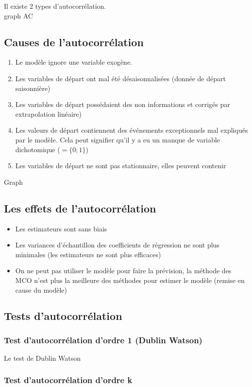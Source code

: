 \documentclass{article}
\begin{document}
Il existe 2 types d'autocorrélation. \\
graph AC

\subsection{Causes de l'autocorrélation}
\begin{enumerate}
	\item Le modèle ignore une variable exogène.
	\item Les variables de départ ont mal été désaisonnalisées (donnée de départ saisonnière)
	\item Les variables de départ possédaient des non informations et corrigés par extrapolation linéaire)
	\item Les valeurs de départ contiennent des événements exceptionnels mal expliqués par le modèle. Cela peut signifier qu'il y a eu un manque de variable dichotomique ($= \{0;1\}$)
	\item Les variables de départ ne sont pas stationnaire, elles peuvent contenir 
\end{enumerate}
Graph

\subsection{Les effets de l'autocorrélation}
\begin{itemize}
	\item Les estimateurs sont sans biais
	\item Les variances d'échantillon des coefficients de régression ne sont plus minimales (les estimateurs ne sont plus efficaces)
	\item On ne peut pas utiliser le modèle pour faire la prévision, la méthode des MCO n'est plus la meilleure des méthodes pour estimer le modèle (remise en cause du modèle)
\end{itemize}
\subsection{Tests d'autocorrélation}
\subsubsection{Test d'autocorrélation d'ordre 1 (Dublin Watson)}
Le test de Dublin Watson
\subsubsection{Test d'autocorrélation d'ordre k}
\end{document}
